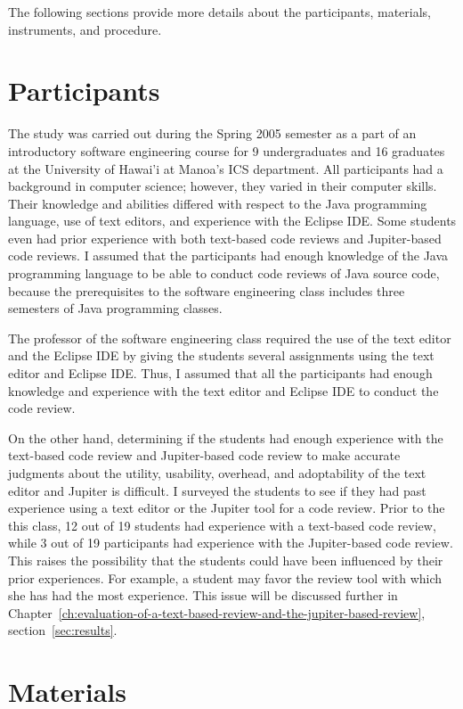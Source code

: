 The following sections provide more details about the participants, materials, instruments, and procedure.

\section{Participants}
\label{sec:participants}

The study was carried out during the Spring 2005 semester as a part of an introductory software engineering course for 9 undergraduates and 16 graduates at the University of Hawai'i at Manoa's ICS department. All participants had a background in computer science; however, they varied in their computer skills. Their knowledge and abilities differed with respect to the Java programming language, use of text editors, and experience with the Eclipse IDE. Some students even had prior experience with both text-based code reviews and Jupiter-based code reviews. I assumed that the participants had enough knowledge of the Java programming language to be able to conduct code reviews of Java source code, because the prerequisites to the software engineering class includes three semesters of Java programming classes.

The professor of the software engineering class required the use of the text editor and the Eclipse IDE by giving the students several assignments using the text editor and Eclipse IDE. Thus, I assumed that all the participants had enough knowledge and experience with the text editor and Eclipse IDE to conduct the code review.

On the other hand, determining if the students had enough experience with the text-based code review and Jupiter-based code review to make accurate judgments about the utility, usability, overhead, and adoptability of the text editor and Jupiter is difficult. I surveyed the students to see if they had past experience using a text editor or the Jupiter tool for a code review. Prior to the this class, 12 out of 19 students had experience with a text-based code review, while 3 out of 19 participants had experience with the Jupiter-based code review. This raises the possibility that the students could have been influenced by their prior experiences. For example, a student may favor the review tool with which she has had the most experience. This issue will be discussed further in Chapter~\ref{ch:evaluation-of-a-text-based-review-and-the-jupiter-based-review}, section~\ref{sec:results}.
 
\section{Materials}
\label{sec:materials}

